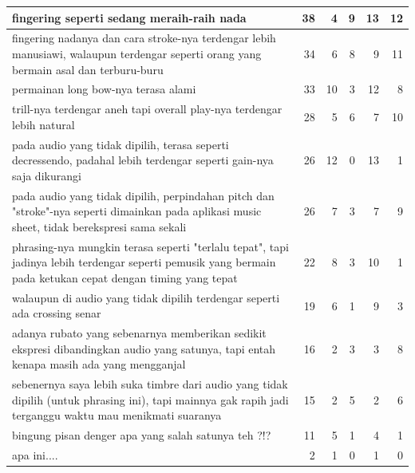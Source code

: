 \begin{longtable}{|p{}|r|r|r|r|r|}
fingering seperti sedang meraih-raih nada&	38&	4&	9&	13&	12\\\hline
fingering nadanya dan cara stroke-nya terdengar lebih manusiawi, walaupun terdengar seperti orang yang bermain asal dan terburu-buru&	34&	6&	8&	9&	11\\\hline
permainan long bow-nya terasa alami&	33&	10&	3&	12&	8\\\hline
trill-nya terdengar aneh tapi overall play-nya terdengar lebih natural&	28&	5&	6&	7&	10\\\hline
pada audio yang tidak dipilih, terasa seperti decressendo, padahal lebih terdengar seperti gain-nya saja dikurangi&	26&	12&	0&	13&	1\\\hline
pada audio yang tidak dipilih, perpindahan pitch dan "stroke"-nya seperti dimainkan pada aplikasi music sheet, tidak berekspresi sama sekali&	26&	7&	3&	7&	9\\\hline
phrasing-nya mungkin terasa seperti "terlalu tepat", tapi jadinya lebih terdengar seperti pemusik yang bermain pada ketukan cepat dengan timing yang tepat&	22&	8&	3&	10&	1\\\hline
walaupun di audio yang tidak dipilih terdengar seperti ada crossing senar&	19&	6&	1&	9&	3\\\hline
adanya rubato yang sebenarnya memberikan sedikit ekspresi dibandingkan audio yang satunya, tapi entah kenapa masih ada yang mengganjal&	16&	2&	3&	3&	8\\\hline
sebenernya saya lebih suka timbre dari audio yang tidak dipilih (untuk phrasing ini), tapi mainnya gak rapih jadi terganggu waktu mau menikmati suaranya&	15&	2&	5&	2&	6\\\hline
bingung pisan denger apa yang salah satunya teh ?!?&	11&	5&	1&	4&	1\\\hline
apa ini....&	2&	1&	0&	1&	0\\\hline
	\end{longtable}
